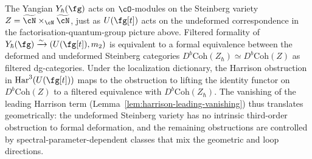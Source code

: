 \begin{remark}
\label{rem:steinberg-filtered-formality}
The Yangian $Y_\hbar(\fg)$ acts on $\cO$-modules on the
Steinberg variety $Z = \widetilde{\cN} \times_{\cN}
\widetilde{\cN}$, just as $U(\fg[t])$ acts on the undeformed
correspondence in the factorisation-quantum-group picture above.
Filtered formality of $Y_\hbar(\fg) \xrightarrow{\sim}
(U(\fg[t]), m_2)$ is equivalent to a formal equivalence
between the deformed and undeformed Steinberg categories
$D^b\mathrm{Coh}(Z_\hbar) \simeq D^b\mathrm{Coh}(Z)$ as
filtered dg-categories. Under the localization dictionary,
the Harrison obstruction in
$\Har^3(U(\fg[t]))$ maps to the obstruction to lifting the
identity functor on $D^b\mathrm{Coh}(Z)$ to a filtered
equivalence with $D^b\mathrm{Coh}(Z_\hbar)$. The vanishing
of the leading Harrison term
(Lemma~\ref{lem:harrison-leading-vanishing}) thus translates
geometrically: the undeformed Steinberg variety has no
intrinsic third-order obstruction to formal deformation, and
the remaining obstructions are controlled by spectral-parameter-dependent classes that mix the
geometric and loop directions.
\end{remark}

